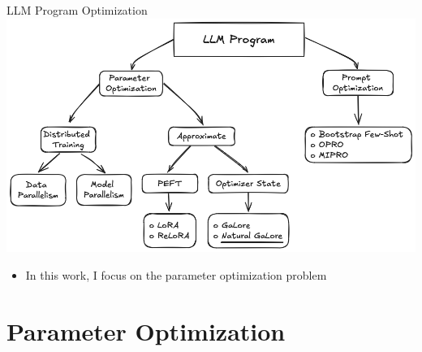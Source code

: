 \documentclass{beamer}
\begin{document}

\begin{frame}{LLM Program Optimization}
    \includegraphics[width=\textwidth]{figures/LLM Program Optimization.png}
    \begin{itemize}
        \item In this work, I focus on the parameter optimization problem
    \end{itemize}
\end{frame}

\section{Parameter Optimization}
\end{document}
